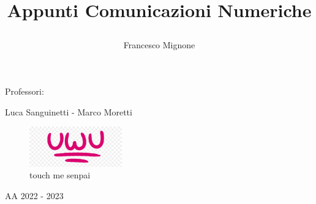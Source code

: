 \title{\bf Appunti Comunicazioni Numeriche \par}
\author{Francesco Mignone}
\date{}
\begin{titlepage}

    \maketitle    

    \begin{center}
        Professori:


        Luca Sanguinetti - Marco Moretti

        \vfill
        \begin{figure}[htp]
            \centering
            \includegraphics[width=4cm]{media/uwu.png}
            \caption{touch me senpai}
            \label{fig:uwu}
        \end{figure}
        AA 2022 - 2023
    \end{center}

\end{titlepage}
